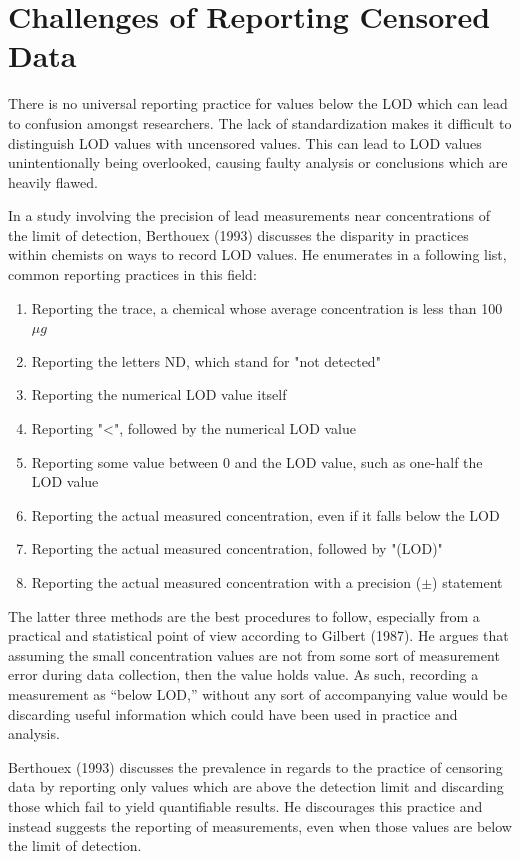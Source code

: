 \documentclass[12pt, twoside]{amherstthesis}
\begin{document}
\hypertarget{challenges}{%
\section{Challenges of Reporting Censored Data}\label{challenges}}

There is no universal reporting practice for values below the LOD which can lead to confusion amongst researchers. The lack of standardization makes it difficult to distinguish LOD values with uncensored values. This can lead to LOD values unintentionally being overlooked, causing faulty analysis or conclusions which are heavily flawed.

In a study involving the precision of lead measurements near concentrations of the limit of detection, Berthouex (1993) discusses the disparity in practices within chemists on ways to record LOD values. He enumerates in a following list, common reporting practices in this field:
\begin{enumerate}
  \item Reporting the trace, a chemical whose average concentration is less than 100 $\mu g$
  \item Reporting  the letters ND, which stand for "not detected"
  \item Reporting the numerical LOD value itself
  \item Reporting "<", followed by the numerical LOD value
  \item Reporting some value between 0 and the LOD value, such as one-half the LOD value
  \item Reporting the actual measured concentration, even if it falls below the LOD
  \item Reporting the actual measured concentration, followed by "(LOD)"
  \item Reporting the actual measured concentration with a precision ($\pm$) statement
\end{enumerate}
The latter three methods are the best procedures to follow, especially from a practical and statistical point of view according to Gilbert (1987). He argues that assuming the small concentration values are not from some sort of measurement error during data collection, then the value holds value. As such, recording a measurement as ``below LOD,'' without any sort of accompanying value would be discarding useful information which could have been used in practice and analysis.

Berthouex (1993) discusses the prevalence in regards to the practice of censoring data by reporting only values which are above the detection limit and discarding those which fail to yield quantifiable results. He discourages this practice and instead suggests the reporting of measurements, even when those values are below the limit of detection.
\end{document}
